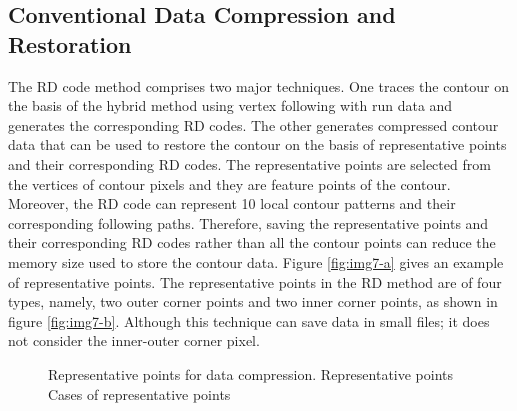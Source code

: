 \subsection{Conventional Data Compression and Restoration}
The RD code method \cite{Miyatake1997Contour} comprises two major techniques. One traces the contour on the basis of the hybrid method using vertex following with run data and generates the corresponding RD codes. The other generates compressed contour data that can be used to restore the contour on the basis of representative points and their corresponding RD codes. The representative points are selected from the vertices of contour pixels and they are feature points of the contour. Moreover, the RD code can represent 10 local contour patterns and their corresponding following paths. Therefore, saving the representative points and their corresponding RD codes rather than all the contour points can reduce the memory size used to store the contour data. Figure \ref{fig:img7-a} \cite{Miyatake1997Contour} gives an example of representative points. The representative points in the RD method are of four types, namely, two outer corner points and two inner corner points, as shown in figure \ref{fig:img7-b}. Although this technique can save data in small files; it does not consider the inner-outer corner pixel. 

\begin{figure}[htbp]
	\centering
	\caption{Representative points for data compression. \protect{} Representative points \cite{Miyatake1997Contour} \protect{} Cases of representative points}
	\label{fig:rdcode}
\end{figure}